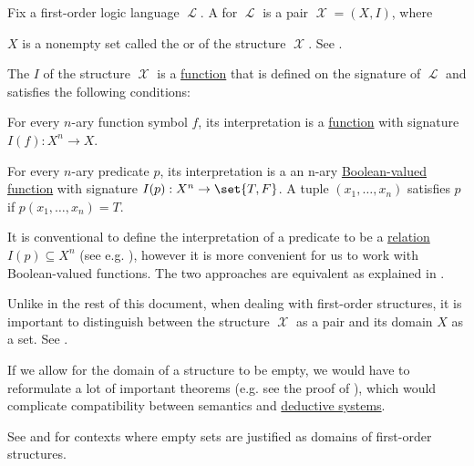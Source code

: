 \begin{definition}\label{def:first_order_structure}
  Fix a first-order logic language \( \mscrL \). A  for \( \mscrL \) is a pair \( \mscrX = (X, I) \), where
  \begin{thmenum}
     \( X \) is a nonempty set called the  or  of the structure \( \mscrX \). See .

     The  \( I \) of the structure \( \mscrX \) is a \hyperref[def:function]{function} that is defined on the signature of \( \mscrL \) and satisfies the following conditions:
    \begin{thmenum}
       For every \( n \)-ary function symbol \( f \), its interpretation is a \hyperref[def:function]{function} with signature \( I(f): X^n \to X \).

       For every \( n \)-ary predicate \( p \), its interpretation is a an n-ary \hyperref[def:boolean_function]{Boolean-valued function} with signature \( I(p): X^n \to \set{ T, F } \). A tuple \( (x_1, \ldots, x_n) \) satisfies \( p \) if \( p(x_1, \ldots, x_n) = T \).

      It is conventional to define the interpretation of a predicate to be a \hyperref[def:relation]{relation} \( I(p) \subseteq X^n \) (see e.g. ), however it is more convenient for us to work with Boolean-valued functions. The two approaches are equivalent as explained in .
    \end{thmenum}
  \end{thmenum}

  Unlike in the rest of this document, when dealing with first-order structures, it is important to distinguish between the structure \( \mscrX \) as a pair and its domain \( X \) as a set. See .
\end{definition}

\begin{remark}\label{rem:empty_models}
   If we allow for the domain of a structure to be empty, we would have to reformulate a lot of important theorems (e.g. see the proof of ), which would complicate compatibility between semantics and \hyperref[def:deductive_system]{deductive systems}.

   See  and  for contexts where empty sets are justified as domains of first-order structures.
\end{remark}

